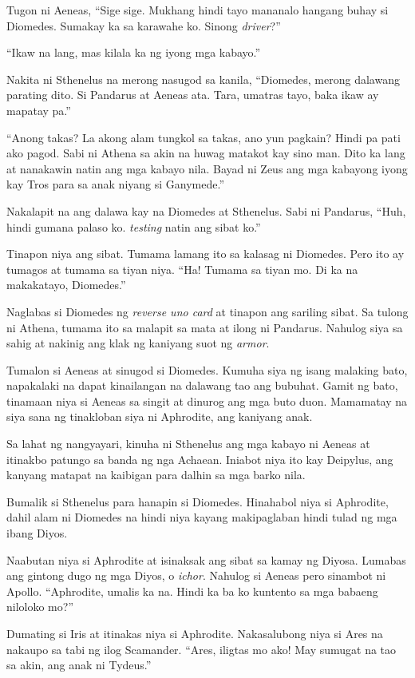 \documentclass[12pt,letterpaper]{report}
\begin{document}
Tugon ni Aeneas, ``Sige sige. Mukhang hindi tayo mananalo hangang buhay si Diomedes. Sumakay ka sa karawahe ko. Sinong \textit{driver}?''

``Ikaw na lang, mas kilala ka ng iyong mga kabayo.''

Nakita ni Sthenelus na merong nasugod sa kanila, ``Diomedes, merong dalawang parating dito. Si Pandarus at Aeneas ata. Tara, umatras tayo, baka ikaw ay mapatay pa.''

``Anong takas? La akong alam tungkol sa takas, ano yun pagkain? Hindi pa pati ako pagod. Sabi ni Athena sa akin na huwag matakot kay sino man. Dito ka lang at nanakawin natin ang mga kabayo nila. Bayad ni Zeus ang mga kabayong iyong kay Tros para sa anak niyang si Ganymede.''

Nakalapit na ang dalawa kay na Diomedes at Sthenelus. Sabi ni Pandarus, ``Huh, hindi gumana palaso ko. \textit{testing} natin ang sibat ko.''

Tinapon niya ang sibat. Tumama lamang ito sa kalasag ni Diomedes. Pero ito ay tumagos at tumama sa tiyan niya. ``Ha! Tumama sa tiyan mo. Di ka na makakatayo, Diomedes.''

Naglabas si Diomedes ng \textit{reverse uno card} at tinapon ang sariling sibat. Sa tulong ni Athena, tumama ito sa malapit sa mata at ilong ni Pandarus. Nahulog siya sa sahig at nakinig ang klak ng kaniyang suot ng \textit{armor}.

Tumalon si Aeneas at sinugod si Diomedes. Kumuha siya ng isang malaking bato, napakalaki na dapat kinailangan na dalawang tao ang bubuhat. Gamit ng bato, tinamaan niya si Aeneas sa singit at dinurog ang mga buto duon. Mamamatay na siya sana ng tinakloban siya ni Aphrodite, ang kaniyang anak.

Sa lahat ng nangyayari, kinuha ni Sthenelus ang mga kabayo ni Aeneas at itinakbo patungo sa banda ng nga Achaean. Iniabot niya ito kay Deipylus, ang kanyang matapat na kaibigan para dalhin sa mga barko nila.

Bumalik si Sthenelus para hanapin si Diomedes. Hinahabol niya si Aphrodite, dahil alam ni Diomedes na hindi niya kayang makipaglaban hindi tulad ng mga ibang Diyos.

Naabutan niya si Aphrodite at isinaksak ang sibat sa kamay ng Diyosa. Lumabas ang gintong dugo ng mga Diyos, o \textit{ichor}. Nahulog si Aeneas pero sinambot ni Apollo. ``Aphrodite, umalis ka na. Hindi ka ba ko kuntento sa mga babaeng niloloko mo?''

Dumating si Iris at itinakas niya si Aphrodite. Nakasalubong niya si Ares na nakaupo sa tabi ng ilog Scamander. ``Ares, iligtas mo ako! May sumugat na tao sa akin, ang anak ni Tydeus.''
\end{document}
